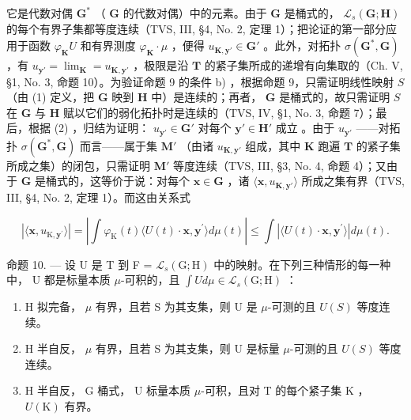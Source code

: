 它是代数对偶 \(\mathbf{G}^*\) （ \(\mathbf{G}\) 的代数对偶）中的元素。由于 \(\mathbf{G}\) 是桶式的， \(\mathcal{L}_s(\mathbf{G};\mathbf{H})\) 的每个有界子集都等度连续（TVS, III, §4, No. 2, 定理 1）；把论证的第一部分应用于函数 \(\varphi_{\mathbf{K}}U\) 和有界测度 \(\varphi_{\mathbf{K}}\cdot \mu\) ，便得 \(u_{\mathbf{K},\mathbf{y}'}\in \mathbf{G}'\) 。此外，对拓扑 \(\sigma (\mathbf{G}^{*},\mathbf{G})\) ，有 \(u_{\mathbf{y}'} = \lim_{\mathbf{K}} = u_{\mathbf{K},\mathbf{y}'}\) ，极限是沿 \(\mathbf{T}\) 的紧子集所成的递增有向集取的（Ch. V, §1, No. 3, 命题 10）。为验证命题 9 的条件 b) ，根据命题 9，只需证明线性映射 \(S\) （由 (1) 定义，把 \(\mathbf{G}\) 映到 \(\mathbf{H}\) 中）是连续的；再者， \(\mathbf{G}\) 是桶式的，故只需证明 \(S\) 在 \(\mathbf{G}\) 与 \(\mathbf{H}\) 赋以它们的弱化拓扑时是连续的（TVS, IV, §1, No. 3, 命题 7）；最后，根据 (2) ，归结为证明： \(u_{\mathbf{y}'}\in \mathbf{G}'\) 对每个 \(\mathbf{y}'\in \mathbf{H}'\) 成立 。由于 \(u_{\mathbf{y}'}\) ——对拓扑 \(\sigma (\mathbf{G}^{*},\mathbf{G})\) 而言——属于集 \(\mathbf{M}'\) （由诸 \(u_{\mathbf{K},\mathbf{y}'}\) 组成，其中 \(\mathbf{K}\) 跑遍 \(\mathbf{T}\) 的紧子集所成之集）的闭包，只需证明 \(\mathbf{M}'\) 等度连续（TVS, III, §3, No. 4, 命题 4）；又由于 \(\mathbf{G}\) 是桶式的，这等价于说：对每个 \(\mathbf{x}\in \mathbf{G}\) ，诸 \(\langle \mathbf{x},u_{\mathbf{K},\mathbf{y}'}\rangle\) 所成之集有界（TVS, III, §4, No. 2, 定理 1）。而这由关系式

\[
| \langle \mathbf {x}, u _ {\mathrm{K}, \mathbf {y} ^ {\prime}} \rangle | = \left| \int \varphi_ {\mathrm{K}} (t) \langle U (t) \cdot \mathbf {x}, \mathbf {y} ^ {\prime} \rangle d \mu (t) \right| \leqslant \int | \langle U (t) \cdot \mathbf {x}, \mathbf {y} ^ {\prime} \rangle | d \mu (t).
\]

命题 10. --- 设 U 是 T 到 F = \(\mathcal{L}_s(\mathrm{G};\mathrm{H})\) 中的映射。在下列三种情形的每一种中， U 都是标量本质 \(\mu\)-可积的，且 \(\int U d\mu \in \mathcal{L}_s(\mathrm{G};\mathrm{H})\) ：

\begin{enumerate}
\def\labelenumi{\alph{enumi})}
\item
  H 拟完备， \(\mu\) 有界，且若 S 为其支集，则 U 是 \(\mu\)-可测的且 \(U(S)\) 等度连续。
\item
  H 半自反， \(\mu\) 有界，且若 S 为其支集，则 U 是标量 \(\mu\)-可测的且 \(U(S)\) 等度连续。
\item
  H 半自反， G 桶式， U 标量本质 \(\mu\)-可积，且对 T 的每个紧子集 K ， \(U(\mathrm{K})\) 有界。
\end{enumerate}

